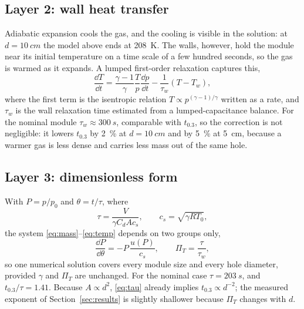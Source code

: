 \subsection{Layer 2: wall heat transfer}
\label{sec:model-thermal}

Adiabatic expansion cools the gas, and the cooling is visible in the
solution: at $d=\SI{10}{cm}$ the model above ends at \SI{208}{K}. The
walls, however, hold the module near its initial temperature on a time
scale of a few hundred seconds, so the gas is warmed as it expands. A
lumped first-order relaxation captures this,
\begin{equation}
  \frac{\dd T}{\dd t}
  = \frac{\gamma-1}{\gamma}\frac{T}{p}\frac{\dd p}{\dd t}
  - \frac{1}{\tau_w}\left(T-T_w\right),
  \label{eq:temp}
\end{equation}
where the first term is the isentropic relation $T\propto
p^{(\gamma-1)/\gamma}$ written as a rate, and $\tau_w$ is the wall
relaxation time estimated from a lumped-capacitance balance. For the
nominal module $\tau_w\approx\SI{300}{s}$, comparable with $t_{0.3}$, so
the correction is not negligible: it lowers $t_{0.3}$ by \SI{2}{\percent}
at $d=\SI{10}{cm}$ and by \SI{5}{\percent} at \SI{5}{cm}, because a warmer
gas is less dense and carries less mass out of the same hole.

\subsection{Layer 3: dimensionless form}
\label{sec:model-pi}

With $P=p/p_0$ and $\theta=t/\tau$, where
\begin{equation}
  \tau = \frac{V}{\gamma C_d A c_s},\qquad c_s=\sqrt{\gamma R T_0},
  \label{eq:tau}
\end{equation}
the system \eqref{eq:mass}--\eqref{eq:temp} depends on two groups only,
\begin{equation}
  \frac{\dd P}{\dd\theta} = -P\,\frac{u(P)}{c_s},\qquad
  \Pi_T = \frac{\tau}{\tau_w},
  \label{eq:pi}
\end{equation}
so one numerical solution covers every module size and every hole
diameter, provided $\gamma$ and $\Pi_T$ are unchanged. For the nominal
case $\tau=\SI{203}{s}$, and $t_{0.3}/\tau=1.41$. Because $A\propto d^2$,
\eqref{eq:tau} already implies $t_{0.3}\propto d^{-2}$; the measured
exponent of Section~\ref{sec:results} is slightly shallower because
$\Pi_T$ changes with $d$.
